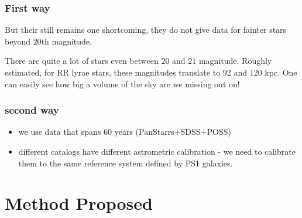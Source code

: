 \documentclass[10pt, compress]{beamer}
\begin{document}
\begin{frame}
\frametitle{First way}
But their still remains one shortcoming, they do not give data for fainter stars beyond $20$th magnitude. 

There are quite a lot of stars even between $20$ and $21$ magnitude. Roughly estimated, for RR lyrae stars, these magnitudes translate to 92 and 120 kpc. One can easily see how big a volume of the sky are we missing out on! 

\end{frame}


\begin{frame}
\frametitle{second way}
	\begin{itemize}
    	\item<1-> we use data that spans 60 years (PanStarrs+SDSS+POSS)
        \item<2-> different catalogs have different astrometric calibration - we need to calibrate them to the same reference system defined by PS1 galaxies. 

    \end{itemize}
\end{frame}



\section{Method Proposed}
\end{document}
